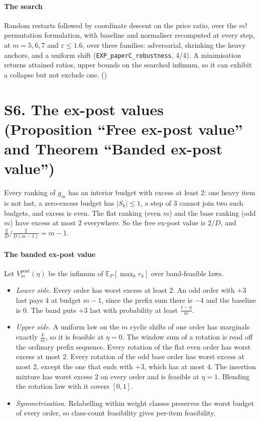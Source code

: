 \paragraph{The search} Random restarts followed by coordinate descent on the price ratio,
over the $m!$ permutation formulation, with baseline and normaliser recomputed at every
step, at $m=5,6,7$ and $\varepsilon\le1.6$, over three families: adversarial, shrinking the
heavy anchors, and a uniform shift (\texttt{EXP\_paperC\_robustness}, 4/4). A minimisation
returns attained ratios, upper bounds on the searched infimum, so it can exhibit a collapse but
not exclude one. (\NUM)

\section{S6. The ex-post values (Proposition ``Free ex-post value'' and Theorem ``Banded
ex-post value'')}

Every ranking of $g_{m}$ has an interior budget with excess at least $2$: one heavy item is
not last, a zero-excess budget has $|S_{k}|\le1$, a step of $3$ cannot join two such budgets,
and excess is even. The flat ranking (even $m$) and the base ranking (odd $m$) have excess
at most $2$ everywhere. So the free ex-post value is $2/D$, and $\frac{2}{D}\big/\frac{2}{D(m-1)}=m-1$.


\paragraph{The banded ex-post value} Let $V^{\mathrm{post}}_{m}(\eta)$ be the infimum of
$\mathbb{E}_{P}[\max_{k}r_{k}]$ over band-feasible laws.
\begin{itemize}
\item \emph{Lower side.} Every order has worst excess at least $2$. An odd order with $+3$
last pays $4$ at budget $m-1$, since the prefix sum there is $-4$ and the baseline is $0$. The
band puts $+3$ last with probability at least $\frac{1-\eta}{m}$.
\item \emph{Upper side.} A uniform law on the $m$ cyclic shifts of one order has marginals
exactly $\frac{k}{m}$, so it is feasible at $\eta=0$. The window sum of a rotation is read off
the ordinary prefix sequence. Every rotation of the flat even order has worst excess at most
$2$. Every rotation of the odd base order has worst excess at most $2$, except the one that
ends with $+3$, which has at most $4$. The insertion mixture has worst excess $2$ on every
order and is feasible at $\eta=1$. Blending the rotation law with it covers $[0,1]$.
\item \emph{Symmetrisation.} Relabelling within weight classes preserves the worst budget
of every order, so class-count feasibility gives per-item feasibility.
\end{itemize}

